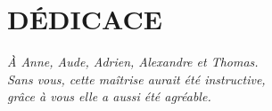 \chapter*{DÉDICACE}\thispagestyle{headings}
\begin{flushright}
  \itshape
  À Anne, Aude, Adrien, Alexandre et Thomas.\\
  Sans vous, cette maîtrise aurait été instructive,\\
  grâce à vous elle a aussi été agréable.
\end{flushright}
